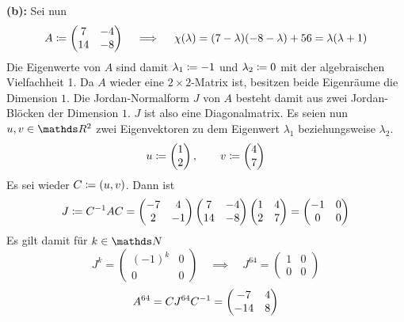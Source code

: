 		\textbf{(b):}
		Sei nun
		\[
			A \coloneqq
			\begin{pmatrix}
				7 & -4 \\
				14 & -8
			\end{pmatrix}
			\quad \implies \quad \chi(\lambda) = (7-\lambda)(-8-\lambda) + 56 = \lambda(\lambda+1)
		\]
		Die Eigenwerte von $A$ sind damit $\lambda_1\coloneqq -1$ und $\lambda_2\coloneqq 0$ mit der algebraischen Vielfachheit 1.
		Da $A$ wieder eine $2\times 2$-Matrix ist, besitzen beide Eigenräume die Dimension $1$.
		Die Jordan-Normalform $J$ von $A$ besteht damit aus zwei Jordan-Blöcken der Dimension $1$.
		$J$ ist also eine Diagonalmatrix.
		Es seien nun $u,v\in\SR^2$ zwei Eigenvektoren zu dem Eigenwert $\lambda_1$ beziehungsweise $\lambda_2$.
		\[
			u\coloneqq
			\begin{pmatrix}
				1 \\ 2
			\end{pmatrix}
			,\qquad v\coloneqq
			\begin{pmatrix}
				4 \\ 7
			\end{pmatrix}
		\]
		Es sei wieder $C\coloneqq (u,v)$.
		Dann ist
		\[
			J\coloneqq{C}^{-1}AC = 
			\begin{pmatrix}
				-7 & 4 \\
				2 & -1
			\end{pmatrix}
			\begin{pmatrix}
				7 & -4 \\
				14 & -8
			\end{pmatrix}
			\begin{pmatrix}
				1 & 4 \\
				2 & 7
			\end{pmatrix}
			=
			\begin{pmatrix}
				-1 & 0 \\
				0 & 0
			\end{pmatrix}
		\]
		Es gilt damit für $k\in\SN$
		\[
			J^k = 
			\begin{pmatrix}
				(-1)^k & 0 \\
				0 & 0
			\end{pmatrix}
			\quad \implies \quad J^{64} = 
			\begin{pmatrix}
				1 & 0 \\
				0 & 0
			\end{pmatrix}
		\]
		\[
			A^{64} = CJ^{64}{C}^{-1} =
			\begin{pmatrix}
				-7 & 4 \\
				-14 & 8
			\end{pmatrix}
		\]

